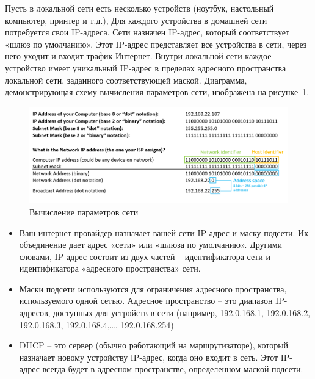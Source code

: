 \documentclass[a4paper,12pt,final,openany]{extbook}
\providecommand{\tightlist}{%
  \setlength{\itemsep}{0pt}\setlength{\parskip}{0pt}}
\begin{document}
Пусть в локальной сети есть несколько устройств (ноутбук, настольный компьютер, принтер
и т.д.), Для каждого устройства в домашней сети потребуется свои
IP-адреса. %
Сети назначен IP-адрес, который соответствует «шлюз по умолчанию». Этот
IP-адрес представляет все устройства в сети, через него уходит и входит
трафик Интернет. Внутри локальной сети каждое устройство имеет
уникальный IP-адрес в пределах адресного пространства локальной сети,
заданного соответствующей маской. %
Диаграмма, демонстрирующая схему вычисления параметров сети, изображена на рисунке~\ref{fig:netparms}.
\begin{figure}[tbh]
  \centering
  \includegraphics[width=0.9\linewidth]{blog/2019/bash-essentials/ipaddresses.PNG}

  \caption{Вычисление параметров сети}
  \label{fig:netparms}
\end{figure}
\begin{itemize}
\tightlist
\item
  Ваш интернет-провайдер назначает вашей сети IP-адрес и маску подсети.
  Их объединение дает адрес «сети» или «шлюза по умолчанию». Другими
  словами, IP-адрес состоит из двух частей -- идентификатора сети и
  идентификатора «адресного пространства» сети.
\item
  Маски подсети используются для ограничения адресного пространства,
  используемого одной сетью. Адресное пространство -- это диапазон
  IP-адресов, доступных для устройств в сети (например, 192.0.168.1,
  192.0.168.2, 192.0.168.3, 192.0.168.4,\ldots, 192.0.168.254)
\item
  DHCP -- это сервер (обычно работающий на маршрутизаторе), который
  назначает новому устройству IP-адрес, когда оно входит в сеть. Этот
  IP-адрес всегда будет в адресном пространстве, определенном маской
  подсети.
\end{itemize}
\end{document}
